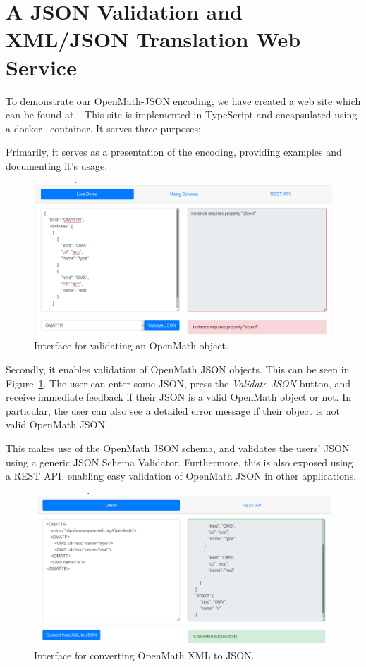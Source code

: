 \section{A JSON Validation and XML/JSON Translation Web Service}

To demonstrate our OpenMath-JSON encoding, we have created a web site which can be found at~\cite{openmathjson:web}. 
This site is implemented in TypeScript and encapsulated using a docker~\cite{docker:webpage} container. 
It serves three purposes:

Primarily, it serves as a presentation of the encoding, providing examples and documenting it's usage. 

\begin{figure}\centering
  \includegraphics[width=\textwidth]{images/validate}
  \caption{Interface for validating an OpenMath object. }\label{figure:validate}
\end{figure}

Secondly, it enables validation of OpenMath JSON objects. 
This can be seen in Figure~\ref{figure:validate}.
The user can enter some JSON, press the \textit{Validate JSON} button, and receive immediate feedback if their JSON is a valid OpenMath object or not. 
In particular, the user can also see a detailed error message if their object is not valid OpenMath JSON. 

This makes use of the OpenMath JSON schema, and validates the users' JSON using a generic JSON Schema Validator. 
Furthermore, this is also exposed using a REST API, enabling easy validation of OpenMath JSON in other applications. 

\begin{figure}\centering
  \includegraphics[width=\textwidth]{images/xml2json}
  \caption{Interface for converting OpenMath XML to JSON.}\label{figure:xml2json}
\end{figure}

